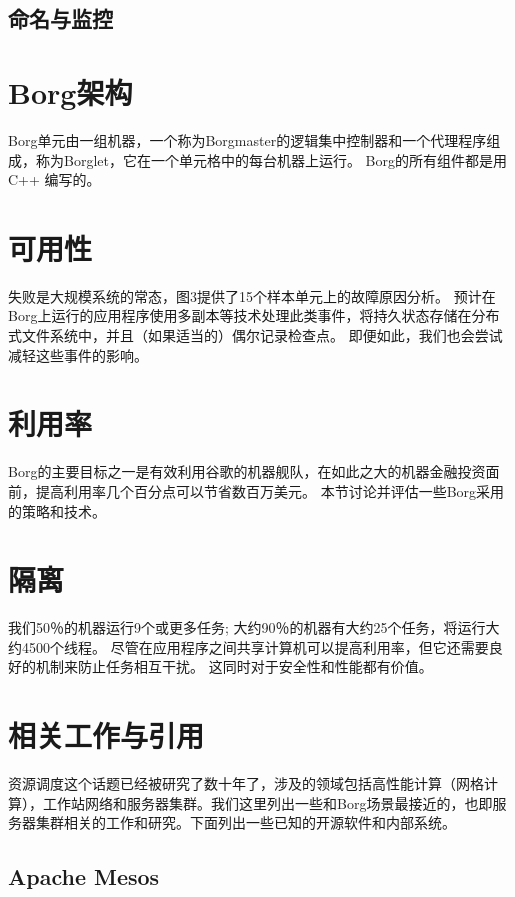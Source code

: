 \subsection{命名与监控}

\section{Borg架构}

Borg单元由一组机器，一个称为Borgmaster的逻辑集中控制器和一个代理程序组成，称为Borglet，它在一个单元格中的每台机器上运行。 Borg的所有组件都是用 C++ 编写的。

\section{可用性}

失败是大规模系统的常态，图3提供了15个样本单元上的故障原因分析。 预计在Borg上运行的应用程序使用多副本等技术处理此类事件，将持久状态存储在分布式文件系统中，并且（如果适当的）偶尔记录检查点。 即便如此，我们也会尝试减轻这些事件的影响。

\section{利用率}

Borg的主要目标之一是有效利用谷歌的机器舰队，在如此之大的机器金融投资面前，提高利用率几个百分点可以节省数百万美元。 本节讨论并评估一些Borg采用的策略和技术。

\section{隔离}

我们50％的机器运行9个或更多任务; 大约90％的机器有大约25个任务，将运行大约4500个线程。 尽管在应用程序之间共享计算机可以提高利用率，但它还需要良好的机制来防止任务相互干扰。 这同时对于安全性和性能都有价值。

\section{相关工作与引用}

资源调度这个话题已经被研究了数十年了，涉及的领域包括高性能计算（网格计算），工作站网络和服务器集群。我们这里列出一些和Borg场景最接近的，也即服务器集群相关的工作和研究。下面列出一些已知的开源软件和内部系统。

\subsection{Apache Mesos}

